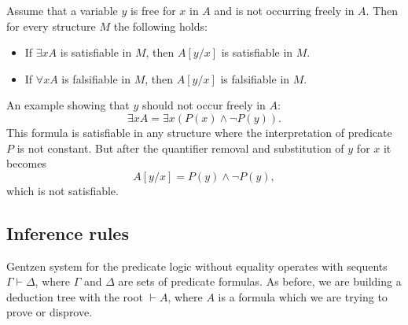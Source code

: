 \begin{page}
\setcounter{section}{2}
\setcounter{subsection}{1}
\setcounter{dfn}{3}
\label{portion:621}

\begin{lem}
\label{lem:VarSubstitute}
Assume that a variable $y$ is free for $x$ in $A$ and is not occurring freely in $A$.
Then for every structure $M$ the following holds:
\begin{itemize}
\item
If $\exists x A$ is satisfiable in $M$, then $A[y/x]$ is satisfiable in $M$.
\item
If $\forall x A$ is falsifiable in $M$, then $A[y/x]$ is falsifiable in $M$.
\end{itemize}
\end{lem}

\end{page}

\begin{page}
\setcounter{section}{2}
\setcounter{subsection}{2}
\setcounter{dfn}{3}
\label{portion:622}


An example showing that $y$ should not occur freely in $A$:
\[
\exists x A = \exists x (P(x) \wedge \neg P(y)).
\]
This formula is satisfiable in any structure where the interpretation of predicate $P$ is not constant.
But after the quantifier removal and substitution of $y$ for $x$ it becomes
\[
A[y/x] = P(y) \wedge \neg P(y),
\]
which is not satisfiable.








\end{page}

\begin{page}
\setcounter{section}{2}
\setcounter{subsection}{2}
\setcounter{dfn}{3}
\label{portion:624}

\subsection{Inference rules}
Gentzen system for the predicate logic without equality operates with sequents $\Gamma \vdash \Delta$,
where $\Gamma$ and $\Delta$ are sets of predicate formulas.
As before, we are building a deduction tree with the root $\vdash A$,
where $A$ is a formula which we are trying to prove or disprove.


\end{page}

